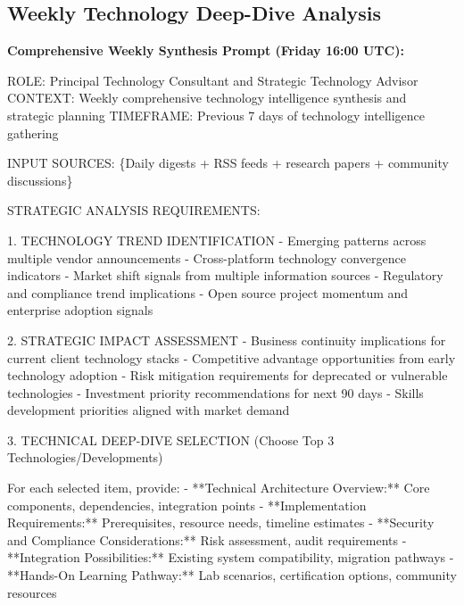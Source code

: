 \documentclass[
  letterpaper,
  DIV=11,
  numbers=noendperiod]{scrartcl}
\newenvironment{Shaded}{\begin{snugshade}}{\end{snugshade}}
\newcommand{\NormalTok}[1]{\textcolor[rgb]{0.00,0.23,0.31}{#1}}
\begin{document}
\subsection{Weekly Technology Deep-Dive
Analysis}\label{weekly-technology-deep-dive-analysis}

\textbf{Comprehensive Weekly Synthesis Prompt (Friday 16:00 UTC):}

\begin{Shaded}
\begin{Highlighting}[]
\NormalTok{ROLE: Principal Technology Consultant and Strategic Technology Advisor}
\NormalTok{CONTEXT: Weekly comprehensive technology intelligence synthesis and strategic planning}
\NormalTok{TIMEFRAME: Previous 7 days of technology intelligence gathering}

\NormalTok{INPUT SOURCES: \{Daily digests + RSS feeds + research papers + community discussions\}}

\NormalTok{STRATEGIC ANALYSIS REQUIREMENTS:}

\NormalTok{1. TECHNOLOGY TREND IDENTIFICATION}
\NormalTok{   {-} Emerging patterns across multiple vendor announcements}
\NormalTok{   {-} Cross{-}platform technology convergence indicators}
\NormalTok{   {-} Market shift signals from multiple information sources}
\NormalTok{   {-} Regulatory and compliance trend implications}
\NormalTok{   {-} Open source project momentum and enterprise adoption signals}

\NormalTok{2. STRATEGIC IMPACT ASSESSMENT}
\NormalTok{   {-} Business continuity implications for current client technology stacks}
\NormalTok{   {-} Competitive advantage opportunities from early technology adoption}
\NormalTok{   {-} Risk mitigation requirements for deprecated or vulnerable technologies}
\NormalTok{   {-} Investment priority recommendations for next 90 days}
\NormalTok{   {-} Skills development priorities aligned with market demand}

\NormalTok{3. TECHNICAL DEEP{-}DIVE SELECTION (Choose Top 3 Technologies/Developments)}
   
\NormalTok{   For each selected item, provide:}
\NormalTok{   {-} **Technical Architecture Overview:** Core components, dependencies, integration points}
\NormalTok{   {-} **Implementation Requirements:** Prerequisites, resource needs, timeline estimates}
\NormalTok{   {-} **Security and Compliance Considerations:** Risk assessment, audit requirements}
\NormalTok{   {-} **Integration Possibilities:** Existing system compatibility, migration pathways}
\NormalTok{   {-} **Hands{-}On Learning Pathway:** Lab scenarios, certification options, community resources}


\end{Highlighting}
\end{Shaded}
\end{document}
